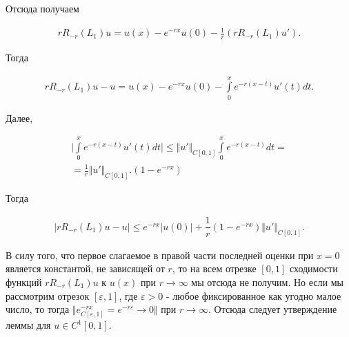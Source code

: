 Отсюда получаем

\begin{equation}
\begin{array}{c}
\nonumber

rR_{-r}(L_1)u = u(x) - e^{-rx}u(0) - \frac{1}{r} (rR_{-r}(L_1)u').

\end{array}
\end{equation}

Тогда

\begin{equation}
\begin{array}{c}
\nonumber

rR_{-r}(L_1)u - u = u(x) - e^{-rx}u(0) - \int\limits_0^x e^{-r(x-t)}u'(t)dt.

\end{array}
\end{equation}

Далее,

\begin{equation}
\begin{array}{c}
\nonumber

\bigl| \int\limits_0^x e^{-r(x-t)}u'(t)dt \bigr| \leq \Vert u' \Vert_{C[0,1]} \int\limits_0^x e^{-r(x-t)}dt = \\
= \frac{1}{r} \Vert u' \Vert_{C[0,1]}.
(1 - e^{-rx}) 
\end{array}
\end{equation}

Тогда

\begin{equation}
\begin{array}{c}

\bigl| rR_{-r}(L_1)u - u \bigr| \leq e^{-rx} \bigl| u(0) \bigr| + \dfrac{1}{r} (1-e^{-rx})\Vert u' \Vert_{C[0,1]}.

\end{array}
\end{equation}

В силу того, что первое слагаемое в правой части последней оценки при $ x = 0 $ является константой, не зависящей от $ r $, то на всем отрезке $ [0,1] $ сходимости функций $ rR_{-r}(L_1)u $ к $ u(x) $ при $ r \rightarrow \infty $ мы отсюда не получим. Но если мы рассмотрим отрезок $ [\varepsilon, 1] $, где $ \varepsilon > 0 $ - любое фиксированное как угодно малое число, то тогда $ \Vert e^{-rx}_{C[\varepsilon,1]} = e^{-r\varepsilon} \rightarrow 0 \Vert $ при $ r \rightarrow \infty $. Отсюда следует утверждение леммы для $ u \in C^1[0,1] $.

